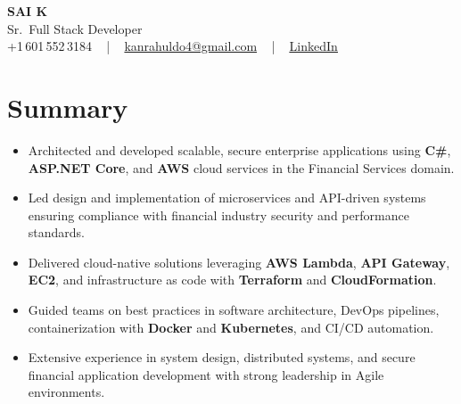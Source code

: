 \documentclass[letterpaper,11pt]{article}
\newcommand{\resumeItem}[1]{
  \item\footnotesize{
    {#1 \vspace{-2pt}}
  }
}
\newcommand{\resumeItemListStart}{\begin{itemize}[leftmargin=*]}
\newcommand{\resumeItemListEnd}{\end{itemize}\vspace{-5pt}}
\begin{document}
\begin{center}
    {\fontsize{14pt}{12pt}\selectfont \textbf{\MakeUppercase{Sai K}}}\\ \vspace{2pt}
    \fontsize{10pt}{12pt}\selectfont Sr.\ Full Stack Developer\\ \vspace{2pt}
    \fontsize{10pt}{12pt}\selectfont +1\,601\,552\,3184 ~ | ~
    \href{mailto:kanrahuldo4@gmail.com}{kanrahuldo4@gmail.com} ~ | ~
    \href{https://www.linkedin.com/in/srrrk/}{\color{blue}\underline{LinkedIn}}
    \vspace{-10pt}
\end{center}

\section{Summary}
\fontsize{9pt}{10pt}\selectfont
\resumeItemListStart
  \resumeItem{Architected and developed scalable, secure enterprise applications using \textbf{C\#}, \textbf{ASP.NET Core}, and \textbf{AWS} cloud services in the Financial Services domain.}
  \resumeItem{Led design and implementation of microservices and API-driven systems ensuring compliance with financial industry security and performance standards.}
  \resumeItem{Delivered cloud-native solutions leveraging \textbf{AWS Lambda}, \textbf{API Gateway}, \textbf{EC2}, and infrastructure as code with \textbf{Terraform} and \textbf{CloudFormation}.}
  \resumeItem{Guided teams on best practices in software architecture, DevOps pipelines, containerization with \textbf{Docker} and \textbf{Kubernetes}, and CI/CD automation.}
  \resumeItem{Extensive experience in system design, distributed systems, and secure financial application development with strong leadership in Agile environments.}
\resumeItemListEnd
\vspace{-6pt}

\end{document}
